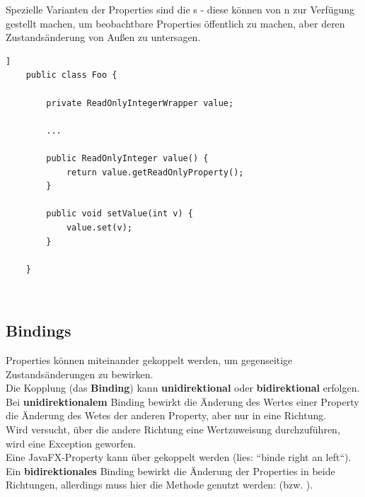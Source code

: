 \noindent
Spezielle Varianten der Properties sind die s - diese können von n zur Verfügung gestellt machen, um beobachtbare Properties öffentlich zu machen, aber deren Zustandsänderung von Außen zu untersagen.

\begin{verbatim}]
    public class Foo {

        private ReadOnlyIntegerWrapper value;

        ...

        public ReadOnlyInteger value() {
            return value.getReadOnlyProperty();
        }

        public void setValue(int v) {
            value.set(v);
        }

    }
\end{verbatim}\\

\subsection{Bindings}

Properties können miteinander gekoppelt werden, um gegenseitige Zustandsänderungen zu bewirken.\\

\noindent
Die Kopplung (das \textbf{Binding}) kann \textbf{unidirektional} oder \textbf{bidirektional} erfolgen.\\

\noindent
Bei \textbf{unidirektionalem} Binding bewirkt die Änderung des Wertes einer Property die Änderung des Wetes der anderen Property, aber nur in eine Richtung.\\
Wird versucht, über die andere Richtung eine Wertzuweisung durchzuführen, wird eine Exception geworfen.\\
Eine JavaFX-Property kann über  gekoppelt werden (lies: ``binde right an left``).\\

\noindent
Ein \textbf{bidirektionales} Binding bewirkt die Änderung der Properties in beide Richtungen, allerdings muss hier die Methode  genutzt werden:  (bzw. ).



